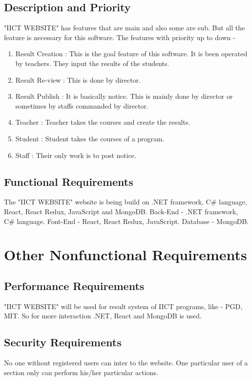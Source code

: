 \documentclass{scrreprt}
\begin{document}
\section{Description and Priority}
"IICT WEBSITE" has features that are main and also some are sub. But all the feature is necessary for this software.
\newline
The features with priority up to down - 
\begin{enumerate}
    \item Result Creation : This is the goal feature of this software. It is been operated by teachers. They input the results of the students.
    \item Result Re-view : This is done by director.
    \item Result Publish : It is basically notice. This is mainly done by director or sometimes by staffs commanded by director.
    \item Teacher : Teacher takes the courses and create the results.
    \item Student : Student takes the courses of a program.
    \item Staff : Their only work is to post notice.
\end{enumerate}

\section{Functional Requirements}
The "IICT WEBSITE" website is being build on .NET framework, C\# language, React, React Redux, JavaScript and MongoDB.
\newline
Back-End - .NET framework, C\# language.
\newline
Font-End - React, React Redux, JavaScript.
\newline
Database -  MongoDB.


\chapter{Other Nonfunctional Requirements}

\section{Performance Requirements}
"IICT WEBSITE" will be used for result system of IICT programs, like - PGD, MIT. So for more interaction .NET, React and MongoDB is used. 

\section{Security Requirements}
No one without registered users can inter to the website. One particular user of a section only can perform his/her particular actions. 
\end{document}
